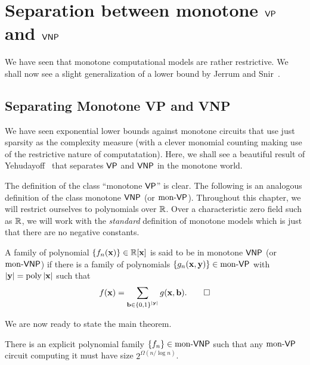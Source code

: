 \chapter{Separation between monotone $\mathsf{VP}$ and $\mathsf{VNP}$}
\label{chap:monVPVNP}

\newcommand{\monVP}{\mathrm{mon}\text{-}\VP}
\newcommand{\monVNP}{\mathrm{mon}\text{-}\VNP}
\newcommand{\Row}{\operatorname{Row}}
\newcommand{\Col}{\operatorname{Col}}


We have seen that monotone computational models are rather restrictive. We shall now see a  slight generalization of a lower bound by Jerrum and Snir~\cite{js82}. 

\section{Separating Monotone VP and VNP}\label{sec:monVPVNP}

We have seen exponential lower bounds against monotone circuits that use just sparsity as the complexity measure (with a clever monomial counting making use of the restrictive nature of computatation). 
Here, we shall see a beautiful result of Yehudayoff~\cite{Yeh18} that separates $\mathsf{VP}$ and $\mathsf{VNP}$ in the monotone world.

The definition of the class ``monotone $\mathsf{VP}$'' is clear. The following is an analogous definition of the class monotone $\mathsf{VNP}$ (or $\monVP$). Throughout this chapter, we will restrict ourselves to polynomials over $\mathbb{R}$. Over a characteristic zero field such as $\mathbb{R}$, we will work with the \emph{standard} definition of monotone models which is just that there are no negative constants.

\begin{definition} A family of polynomial $\left\{f_n(\mathbf{x})\right\} \in \mathbb{R}[\mathbf{x}]$ is said to be in monotone $\mathsf{VNP}$ (or $\monVNP$) if there is a family of polynomials $\set{g_n(\vecx, \vecy)} \in \monVP$ with $\left|\mathbf{y}\right| = \operatorname{poly}{\left|\mathbf{x}\right|}$ such that
  \[
    f(\mathbf{x}) = \sum_{\mathbf{b} \in \left\{0,1\right\}^{\left|\mathbf{y}\right|}} g(\mathbf{x}, \mathbf{b}).\qedhere
  \]
\end{definition}

We are now ready to state the main theorem.

\begin{theorem}\label{thm:monVPVNPseparation}
There is an explicit polynomial family $\set{f_n} \in \monVNP$ such that any $\monVP$ circuit computing it must have size $2^{\Omega(n/\log n)}$.
\end{theorem}

